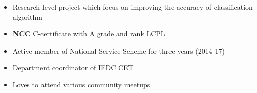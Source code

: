 \par
{}
\begin{itemize}
\item\justify Research level project which focus on improving the accuracy of classification algorithm
\end{itemize}
\smallskip
{}
\par

\begin{itemize}
    \item  \textbf{NCC} C-certificate with A grade and rank LCPL
    \item  Active member of National Service Scheme for three years (2014-17)
    \item Department coordinator of IEDC CET
    \item Loves to attend various community meetups
\end{itemize}

\clearpage





